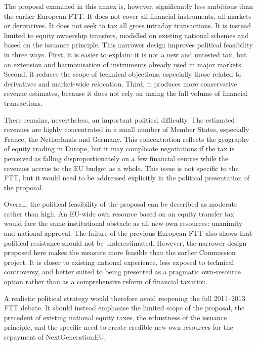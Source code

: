\documentclass[../../main]{subfiles}
\begin{document}
The proposal examined in this annex is, however, significantly less ambitious than the earlier European FTT. It does not cover all financial instruments, all markets or derivatives. It does not seek to tax all gross intraday transactions. It is instead limited to equity ownership transfers, modelled on existing national schemes and based on the issuance principle. This narrower design improves political feasibility in three ways. First, it is easier to explain: it is not a new and untested tax, but an extension and harmonisation of instruments already used in major markets. Second, it reduces the scope of technical objections, especially those related to derivatives and market-wide relocation. Third, it produces more conservative revenue estimates, because it does not rely on taxing the full volume of financial transactions.

There remains, nevertheless, an important political difficulty. The estimated revenues are highly concentrated in a small number of Member States, especially France, the Netherlands and Germany. This concentration reflects the geography of equity trading in Europe, but it may complicate negotiations if the tax is perceived as falling disproportionately on a few financial centres while the revenues accrue to the EU budget as a whole. This issue is not specific to the FTT, but it would need to be addressed explicitly in the political presentation of the proposal.

Overall, the political feasibility of the proposal can be described as moderate rather than high. An EU-wide own resource based on an equity transfer tax would face the same institutional obstacle as all new own resources: unanimity and national approval. The failure of the previous European FTT also shows that political resistance should not be underestimated. However, the narrower design proposed here makes the measure more feasible than the earlier Commission project. It is closer to existing national experience, less exposed to technical controversy, and better suited to being presented as a pragmatic own-resource option rather than as a comprehensive reform of financial taxation.

A realistic political strategy would therefore avoid reopening the full 2011--2013 FTT debate. It should instead emphasise the limited scope of the proposal, the precedent of existing national equity taxes, the robustness of the issuance principle, and the specific need to create credible new own resources for the repayment of NextGenerationEU.
\end{document}
